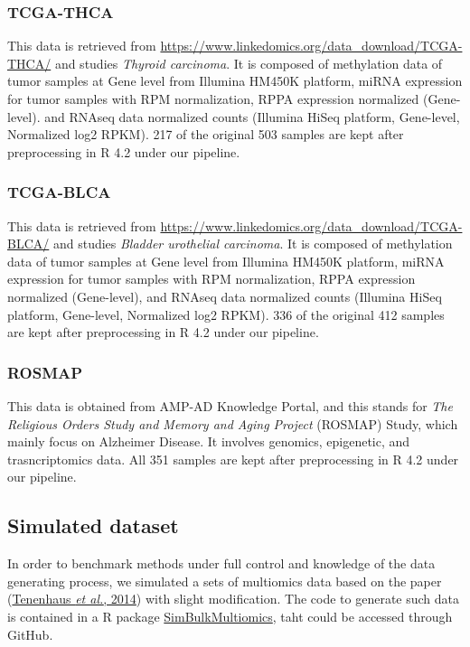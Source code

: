 \documentclass[
]{article}
\begin{document}
\hypertarget{tcga-thca}{%
\subsubsection{TCGA-THCA}\label{tcga-thca}}

This data is retrieved from \url{https://www.linkedomics.org/data_download/TCGA-THCA/} and studies \emph{Thyroid carcinoma}. It is composed of methylation data of tumor samples at Gene level from Illumina HM450K platform, miRNA expression for tumor samples with RPM normalization, RPPA expression normalized (Gene-level). and RNAseq data normalized counts (Illumina HiSeq platform, Gene-level, Normalized log2 RPKM). 217 of the original 503 samples are kept after preprocessing in R 4.2 under our pipeline.

\hypertarget{tcga-blca}{%
\subsubsection{TCGA-BLCA}\label{tcga-blca}}

This data is retrieved from \url{https://www.linkedomics.org/data_download/TCGA-BLCA/} and studies \emph{Bladder urothelial carcinoma}. It is composed of methylation data of tumor samples at Gene level from Illumina HM450K platform, miRNA expression for tumor samples with RPM normalization, RPPA expression normalized (Gene-level), and RNAseq data normalized counts (Illumina HiSeq platform, Gene-level, Normalized log2 RPKM). 336 of the original 412 samples are kept after preprocessing in R 4.2 under our pipeline.

\hypertarget{rosmap}{%
\subsubsection{ROSMAP}\label{rosmap}}

This data is obtained from AMP-AD Knowledge Portal, and this stands for \emph{The Religious Orders Study and Memory and Aging Project} (ROSMAP) Study, which mainly focus on Alzheimer Disease. It involves genomics, epigenetic, and trasncriptomics data. All 351 samples are kept after preprocessing in R 4.2 under our pipeline.

\hypertarget{simulated-dataset}{%
\subsection{Simulated dataset}\label{simulated-dataset}}

In order to benchmark methods under full control and knowledge of the data generating process, we simulated a sets of multiomics data based on the paper (\protect\hyperlink{ref-tenenhaus2014variable}{Tenenhaus \emph{et al.}, 2014}) with slight modification. The code to generate such data is contained in a R package \href{cite}{SimBulkMultiomics}, taht could be accessed through GitHub.
\end{document}
